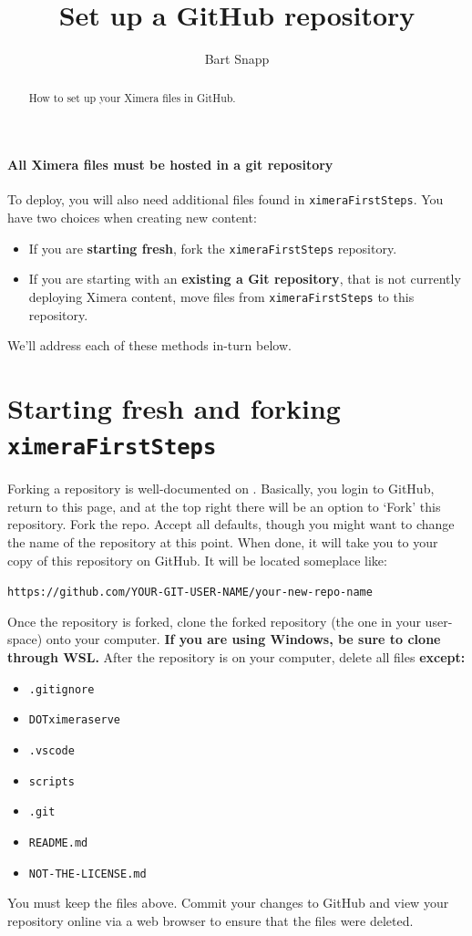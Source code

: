 \documentclass{ximera}
\title{Set up a GitHub repository}
\author{Bart Snapp}
\begin{document}
\begin{abstract}
  How to set up your Ximera files in GitHub.
\end{abstract}
\maketitle

\paragraph{All Ximera files must be hosted in a git repository} To deploy, you
will also need	additional
files found in \verb!ximeraFirstSteps!. You have two choices when creating new
content:
\begin{itemize}
  \item If you are \textbf{starting fresh}, fork the \texttt{ximeraFirstSteps}
        repository.
  \item If you are starting with an \textbf{existing a Git repository}, that is
        not currently deploying Ximera content, move files
        from \texttt{ximeraFirstSteps} to this repository.
\end{itemize}
We'll address each of these methods in-turn below.

\section{Starting fresh and forking \texttt{ximeraFirstSteps}}

Forking a repository is well-documented on
.
Basically, you login to GitHub, return to this page, and at the top right there
will be an option to `Fork' this repository. Fork the repo. Accept all
defaults, though you might want to change the name of the repository at this
point. When done, it will take you to
your copy of this repository on GitHub. It will be located someplace like:
\begin{center}
  \texttt{https://github.com/YOUR-GIT-USER-NAME/your-new-repo-name}
\end{center}
Once the repository is forked, clone the forked repository (the one in your
user-space) onto your computer. \textbf{If you are using Windows, be sure to
  clone through WSL.}
After the repository is on your computer, delete all files \textbf{except:}
\begin{itemize}
  \item \texttt{.gitignore}
  \item \texttt{DOTximeraserve}
  \item \texttt{.vscode}
  \item \texttt{scripts}
  \item \texttt{.git}
  \item \texttt{README.md}
  \item \texttt{NOT-THE-LICENSE.md}
\end{itemize}
You must keep the files above.	Commit your changes to GitHub and view your
repository online via a web browser to ensure that the files were deleted.
\end{document}
